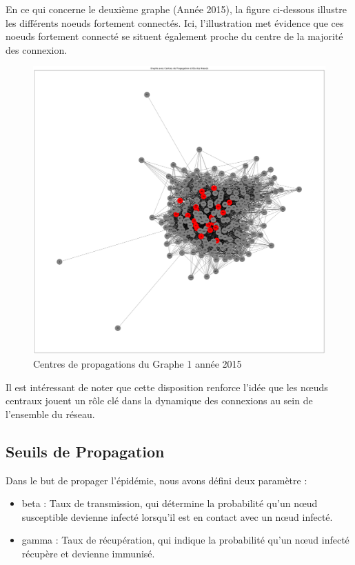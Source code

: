 \documentclass{article}
\begin{document}
\clearpage
\newpage
En ce qui concerne le deuxième graphe (Année 2015), la figure ci-dessous illustre les différents noeuds fortement connectés. Ici, l'illustration met évidence que ces noeuds fortement connecté se situent également proche du centre de la majorité des connexion.

\begin{figure}[!h]
    \centering
    \includegraphics[width=15cm]{assets/epidemiologie/centre_propa_2015}
    \caption{Centres de propagations du Graphe 1 année 2015}
    \label{fig:centre_propa_2015}
\end{figure}

Il est intéressant de noter que cette disposition renforce l'idée que les nœuds centraux jouent un rôle clé dans la dynamique des connexions au sein de l'ensemble du réseau.

\clearpage
\newpage
\subsection{Seuils de Propagation}

\noindent
Dans le but de propager l'épidémie, nous avons défini deux paramètre :
\begin{itemize}
    \item beta : Taux de transmission, qui détermine la probabilité qu'un nœud susceptible devienne infecté lorsqu'il est en contact avec un nœud infecté.
    \item gamma : Taux de récupération, qui indique la probabilité qu'un nœud infecté récupère et devienne immunisé. \\
\end{itemize}
\end{document}

